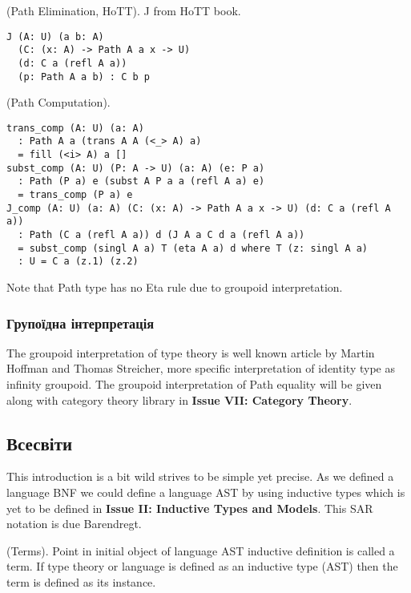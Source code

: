 \begin{theorem} (Path Elimination, HoTT).
J from HoTT book.
\begin{lstlisting}
J (A: U) (a b: A)
  (C: (x: A) -> Path A a x -> U)
  (d: C a (refl A a))
  (p: Path A a b) : C b p
\end{lstlisting}
\end{theorem}

\begin{theorem} (Path Computation).
\begin{lstlisting}
trans_comp (A: U) (a: A)
  : Path A a (trans A A (<_> A) a)
  = fill (<i> A) a []
subst_comp (A: U) (P: A -> U) (a: A) (e: P a)
  : Path (P a) e (subst A P a a (refl A a) e)
  = trans_comp (P a) e
J_comp (A: U) (a: A) (C: (x: A) -> Path A a x -> U) (d: C a (refl A a))
  : Path (C a (refl A a)) d (J A a C d a (refl A a))
  = subst_comp (singl A a) T (eta A a) d where T (z: singl A a)
  : U = C a (z.1) (z.2)
\end{lstlisting}
\end{theorem}

Note that  Path type has no Eta rule due to groupoid interpretation.

\subsubsection{Групоїдна інтерпретація}

The groupoid interpretation of type theory is well known article by Martin Hoffman and Thomas Streicher,
more specific interpretation of identity type as infinity groupoid.
The groupoid interpretation of Path equality will be given along with category theory library
in \textbf{Issue VII: Category Theory}.

\subsection{Всесвіти}

This introduction is a bit wild strives to be simple yet precise.
As we defined a language BNF we could define a language AST by
using inductive types which is yet to be defined
in \textbf{Issue II: Inductive Types and Models}. This SAR notation is due Barendregt.

\begin{definition} (Terms). Point in initial object of language AST
inductive definition is called a term. If type theory or language is defined as
an inductive type (AST) then the term is defined as its instance.
\end{definition}

